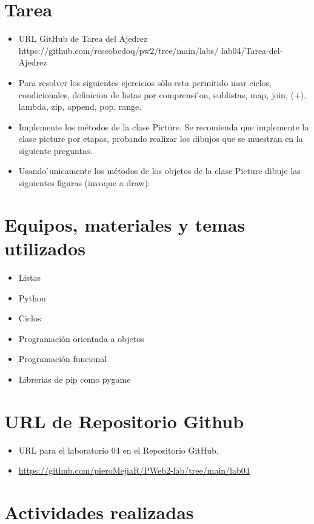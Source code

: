 \documentclass{article}
\begin{document}
	\section{Tarea}
	\begin{itemize}		
		\item URL GitHub de Tarea del Ajedrez https://github.com/rescobedoq/pw2/tree/main/labs/
lab04/Tarea-del-Ajedrez
		\item Para resolver los siguientes ejercicios sòlo esta permitido usar ciclos, condicionales, definicion de listas por comprensi ́on, sublistas, map, join, (+), lambda, zip, append, pop, range.
		\item Implemente los métodos de la clase Picture. Se recomienda que implemente la clase picture por etapas, probando realizar los dibujos que se muestran en la siguiente preguntas.
            \item Usando  ́unicamente los métodos de los objetos de la clase Picture dibuje las siguientes figuras (invoque a draw):
	\end{itemize}
		
	\section{Equipos, materiales y temas utilizados}
	\begin{itemize}
		\item Listas
		\item Python
		\item Ciclos
		\item Programación orientada a objetos
		\item Programación funcional
		\item Librerias de pip como pygame
	\end{itemize}
	\section{URL de Repositorio Github}
	\begin{itemize}
		\item URL para el laboratorio 04 en el Repositorio GitHub.
		\item \url{https://github.com/pieroMejiaR/PWeb2-lab/tree/main/lab04}
	\end{itemize}
	
	\section{Actividades realizadas}
	
\end{document}
